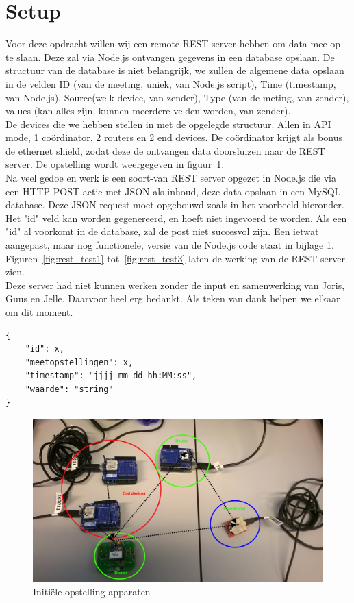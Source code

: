 \documentclass[12pt]{article}
\begin{document}
\clearpage

\section{Setup}

Voor deze opdracht willen wij een remote REST server hebben om data mee op te slaan. Deze zal via Node.js ontvangen gegevens in een database opslaan. De structuur van de database is niet belangrijk, we zullen de algemene data opslaan in de velden ID (van de meeting, uniek, van Node.js script), Time (timestamp, van Node.js), Source(welk device, van zender), Type (van de meting, van zender), values (kan alles zijn, kunnen meerdere velden worden, van zender). \\
De devices die we hebben stellen in met de opgelegde structuur. Allen in API mode, 1 coördinator, 2 routers en 2 end devices. De coördinator krijgt als bonus de ethernet shield, zodat deze de ontvangen data doorsluizen naar de REST server. De opstelling wordt weergegeven in figuur~\ref{fig:setup1}.\\
Na veel gedoe en werk is een soort-van REST server opgezet in Node.js die via een HTTP POST actie met JSON als inhoud, deze data opslaan in een MySQL database. Deze JSON request moet opgebouwd zoals in het voorbeeld hieronder. Het "id" veld kan worden gegenereerd, en hoeft niet ingevoerd te worden. Als een "id" al voorkomt in de database, zal de post niet succesvol zijn. Een ietwat aangepast, maar nog functionele, versie van de Node.js code staat in bijlage 1.\\
Figuren~\ref{fig:rest_test1} tot~\ref{fig:rest_test3} laten de werking van de REST server zien. \\
Deze server had niet kunnen werken zonder de input en samenwerking van Joris, Guus en Jelle. Daarvoor heel erg bedankt. Als teken van dank helpen we elkaar om dit moment. 
\begin{lstlisting}
{
	"id": x,
	"meetopstellingen": x,
	"timestamp": "jjjj-mm-dd hh:MM:ss",
	"waarde": "string"
}
\end{lstlisting}
\clearpage
\begin{figure}
\begin{center}
\includegraphics[scale=.4]{Test_setup_1.jpg}
\caption{Initiële opstelling apparaten}
\label{fig:setup1}
\end{center}
\end{figure}
\end{document}

